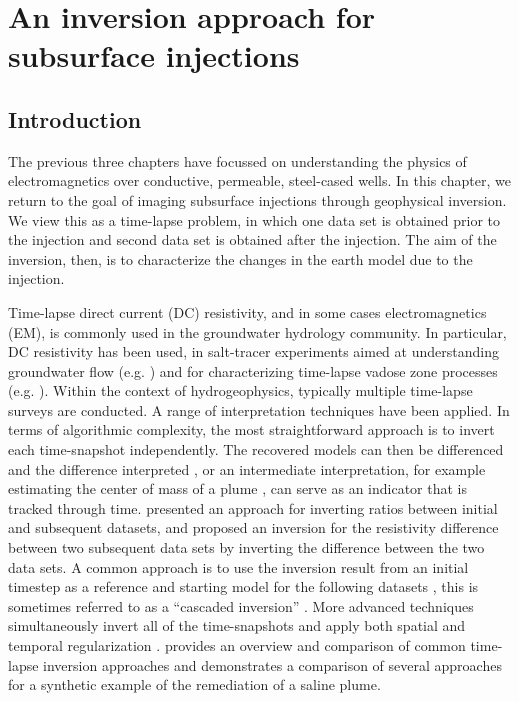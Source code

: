 

\chapter{An inversion approach for subsurface injections}
\label{ch:inversion}

\section{Introduction}

The previous three chapters have focussed on understanding the physics of electromagnetics over conductive, permeable, steel-cased wells. In this chapter, we return to the goal of imaging subsurface injections through geophysical inversion. We view this as a time-lapse problem, in which one data set is obtained prior to the injection and second data set is obtained after the injection. The aim of the inversion, then, is to characterize the changes in the earth model due to the injection.

Time-lapse direct current (DC) resistivity, and in some cases electromagnetics (EM), is commonly used in the groundwater hydrology community. In particular, DC resistivity has been used, in salt-tracer experiments aimed at understanding groundwater flow (e.g. \cite{Slater2002, Kemna2002, Singha2005, Doetsch2012}) and for characterizing time-lapse vadose zone processes (e.g. \cite{Daily1992, Park1998, Binley2002}). Within the context of hydrogeophysics, typically multiple time-lapse surveys are conducted. A range of interpretation techniques have been applied. In terms of algorithmic complexity, the most straightforward approach is to invert each time-snapshot independently. The recovered models can then be differenced and the difference interpreted \citep{Cassiani2006}, or an intermediate interpretation, for example estimating the center of mass of a plume \citep{Singha2006, Doetsch2012}, can serve as an indicator that is tracked through time. \cite{Daily1992} presented an approach for inverting ratios between initial and subsequent datasets, and \citep{Labreque2001} proposed an inversion for the resistivity difference between two subsequent data sets by inverting the difference between the two data sets. A common approach is to use the inversion result from an initial timestep as a reference and starting model for the following datasets \citep{Loke2001, Oldenborger2007}, this is sometimes referred to as a ``cascaded inversion'' \citep{Miller2008}. More advanced techniques simultaneously invert all of the time-snapshots and apply both spatial and temporal regularization \citep{Kim2009, Kim2010, Loke2014}. \cite{Hayley2011} provides an overview and comparison of common time-lapse inversion approaches and demonstrates a comparison of several approaches for a synthetic example of the remediation of a saline plume.

